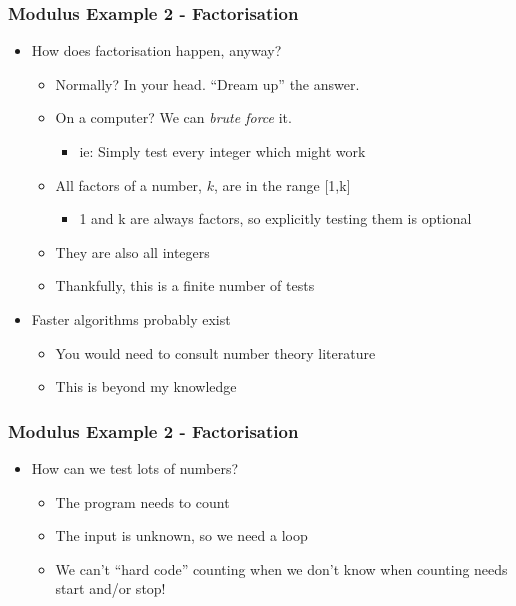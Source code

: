 \documentclass[14pt]{beamer}
\begin{document}
\begin{frame}
\frametitle{Modulus Example 2 - Factorisation}
\begin{itemize}
\item How does factorisation happen, anyway?
	\begin{itemize}
		\item Normally? In your head. ``Dream up'' the answer.
		\item On a computer? We can \textit{brute force} it.
			\begin{itemize}
				\item ie: Simply test every integer which might work	
			\end{itemize}
		\item All factors of a number, $k$, are in the range [1,k]
			\begin{itemize}
				\item 1 and k are always factors, so explicitly testing them is optional
			\end{itemize}
		\item They are also all integers
		\item Thankfully, this is a finite number of tests
	\end{itemize}
\item Faster algorithms probably exist
	\begin{itemize}
		\item You would need to consult number theory literature
		\item This is beyond my knowledge
	\end{itemize}
\end{itemize}
\end{frame}

\begin{frame}
\frametitle{Modulus Example 2 - Factorisation}
\begin{itemize}
\item How can we test lots of numbers?
	\begin{itemize}
		\item The program needs to count
		\item The input is unknown, so we need a loop
		\item We can't ``hard code'' counting when  we don't know when counting needs start and/or stop!
	\end{itemize}
\end{itemize}
\end{frame}
\end{document}
